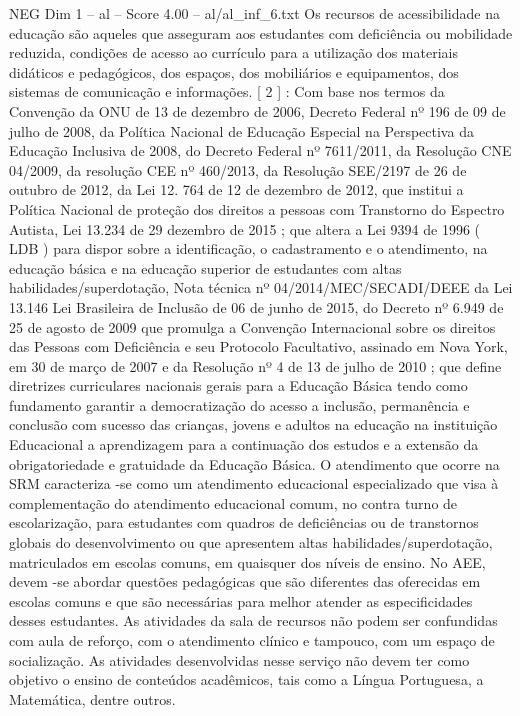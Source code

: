 \begin{textsample}{NEG Dim 1 – al – Score 4.00 – al/al\_inf\_6.txt}
Os recursos de acessibilidade na educação são aqueles que asseguram aos estudantes com deficiência ou mobilidade reduzida, condições de acesso ao currículo para a utilização dos materiais didáticos e pedagógicos, dos espaços, dos mobiliários e equipamentos, dos sistemas de comunicação e informações. [ 2 ] : Com base nos termos da Convenção da ONU de 13 de dezembro de 2006, Decreto Federal nº 196 de 09 de julho de 2008, da Política Nacional de Educação Especial na Perspectiva da Educação Inclusiva de 2008, do Decreto Federal nº 7611/2011, da Resolução CNE 04/2009, da resolução CEE nº 460/2013, da Resolução SEE/2197 de 26 de outubro de 2012, da Lei 12. 764 de 12 de dezembro de 2012, que institui a Política Nacional de proteção dos direitos a pessoas com Transtorno do Espectro Autista, Lei 13.234 de 29 dezembro de 2015 ; que altera a Lei 9394 de 1996 ( LDB ) para dispor sobre a identificação, o cadastramento e o atendimento, na educação básica e na educação superior de estudantes com altas habilidades/superdotação, Nota técnica nº 04/2014/MEC/SECADI/DEEE da Lei 13.146 Lei Brasileira de Inclusão de 06 de junho de 2015, do Decreto nº 6.949 de 25 de agosto de 2009 que promulga a Convenção Internacional sobre os direitos das Pessoas com Deficiência e seu Protocolo Facultativo, assinado em Nova York, em 30 de março de 2007 e da Resolução nº 4 de 13 de julho de 2010 ; que define diretrizes curriculares nacionais gerais para a Educação Básica tendo como fundamento garantir a democratização do acesso a inclusão, permanência e conclusão com sucesso das crianças, jovens e adultos na educação na instituição Educacional a aprendizagem para a continuação dos estudos e a extensão da obrigatoriedade e gratuidade da Educação Básica.
O atendimento que ocorre na SRM caracteriza -se como um atendimento educacional especializado que visa à complementação do atendimento educacional comum, no contra turno de escolarização, para estudantes com quadros de deficiências ou de transtornos globais do desenvolvimento ou que apresentem altas habilidades/superdotação, matriculados em escolas comuns, em quaisquer dos níveis de ensino.
No AEE, devem -se abordar questões pedagógicas que são diferentes das oferecidas em escolas comuns e que são necessárias para melhor atender as especificidades desses estudantes.
As atividades da sala de recursos não podem ser confundidas com aula de reforço, com o atendimento clínico e tampouco, com um espaço de socialização.
As atividades desenvolvidas nesse serviço não devem ter como objetivo o ensino de conteúdos acadêmicos, tais como a Língua Portuguesa, a Matemática, dentre outros.

\end{textsample}
